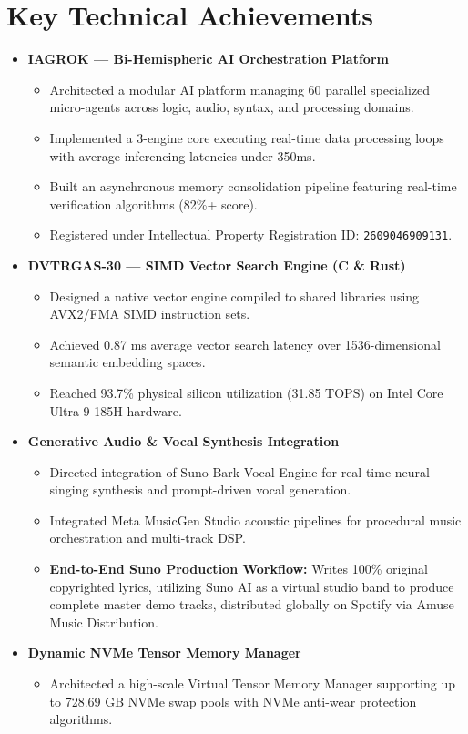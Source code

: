 \documentclass[11pt,a4paper,sans]{moderncv}
\begin{document}
\section{Key Technical Achievements}
\begin{itemize}
\item \textbf{IAGROK — Bi-Hemispheric AI Orchestration Platform}
  \begin{itemize}
  \item Architected a modular AI platform managing 60 parallel specialized micro-agents across logic, audio, syntax, and processing domains.
  \item Implemented a 3-engine core executing real-time data processing loops with average inferencing latencies under 350ms.
  \item Built an asynchronous memory consolidation pipeline featuring real-time verification algorithms (82\%+ score).
  \item Registered under Intellectual Property Registration ID: \texttt{2609046909131}.
  \end{itemize}

\item \textbf{DVTRGAS-30 — SIMD Vector Search Engine (C \& Rust)}
  \begin{itemize}
  \item Designed a native vector engine compiled to shared libraries using AVX2/FMA SIMD instruction sets.
  \item Achieved 0.87 ms average vector search latency over 1536-dimensional semantic embedding spaces.
  \item Reached 93.7\% physical silicon utilization (31.85 TOPS) on Intel Core Ultra 9 185H hardware.
  \end{itemize}

\item \textbf{Generative Audio \& Vocal Synthesis Integration}
  \begin{itemize}
  \item Directed integration of Suno Bark Vocal Engine for real-time neural singing synthesis and prompt-driven vocal generation.
  \item Integrated Meta MusicGen Studio acoustic pipelines for procedural music orchestration and multi-track DSP.
  \item \textbf{End-to-End Suno Production Workflow:} Writes 100\% original copyrighted lyrics, utilizing Suno AI as a virtual studio band to produce complete master demo tracks, distributed globally on Spotify via Amuse Music Distribution.
  \end{itemize}

\item \textbf{Dynamic NVMe Tensor Memory Manager}
  \begin{itemize}
  \item Architected a high-scale Virtual Tensor Memory Manager supporting up to 728.69 GB NVMe swap pools with NVMe anti-wear protection algorithms.
  \end{itemize}
\end{itemize}
\end{document}
